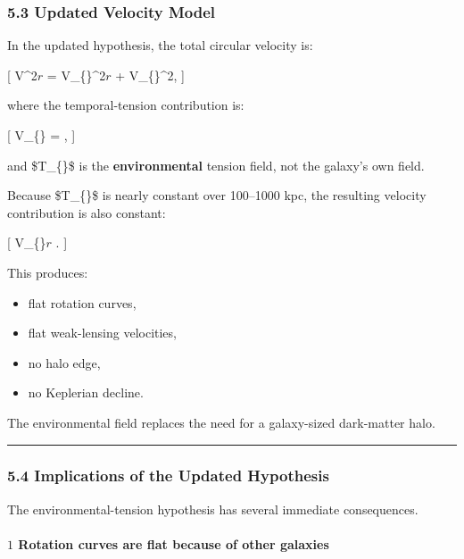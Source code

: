 \subsubsection{5.3 Updated Velocity Model}\label{updated-velocity-model}

In the updated hypothesis, the total circular velocity is:

{[} V\^{}2\(r\) = V\_\{\}\^{}2\(r\) +
V\_\{\}\^{}2,  {]}

where the temporal-tension contribution is:

{[} V\_\{\} = ,  {]}

and \$T\_\{\}\$ is the \textbf{environmental} tension field,
not the galaxy's own field.

Because \$T\_\{\}\$ is nearly constant over 100--1000 kpc, the
resulting velocity contribution is also constant:

{[} V\_\{\}\(r\) \approx {}.  {]}

This produces:

\begin{itemize}
\tightlist
\item
  flat rotation curves,
\item
  flat weak-lensing velocities,
\item
  no halo edge,
\item
  no Keplerian decline.
\end{itemize}

The environmental field replaces the need for a galaxy-sized dark-matter
halo.

\begin{center}\rule{0.5\linewidth}{0.5pt}\end{center}

\subsubsection{5.4 Implications of the Updated
Hypothesis}\label{implications-of-the-updated-hypothesis}

The environmental-tension hypothesis has several immediate consequences.

\paragraph{\texorpdfstring{\textbf{\(1\) Rotation curves are flat
because of other
galaxies}}{1 Rotation curves are flat because of other galaxies}}\label{rotation-curves-are-flat-because-of-other-galaxies}


